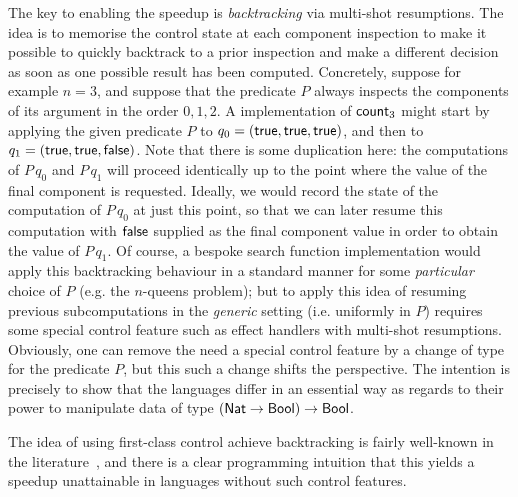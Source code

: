 \documentclass[12pt,phd,lfcs,twoside,openright,logo,leftchapter,normalheadings]{infthesis}
\theoremstyle{plain}
\theoremstyle{definition}
\begin{document}
The key to enabling the speedup is \emph{backtracking} via multi-shot
resumptions. The idea is to memorise the control state at each
component inspection to make it possible to quickly backtrack to a
prior inspection and make a different decision as soon as one
possible result has been computed.
%
Concretely, suppose for example $n = 3$, and suppose that the predicate
$P$ always inspects the components of its argument in the order
$0,1,2$.
%
A \naive implementation of $\mathsf{count}_3$ might start by applying the
given predicate $P$ to $q_0 = (\mathsf{true},\mathsf{true},\mathsf{true})$, and then to
$q_1 = (\mathsf{true},\mathsf{true},\mathsf{false})$.  Note that there is some duplication
here: the computations of $P\,q_0$ and $P\,q_1$ will proceed
identically up to the point where the value of the final component is
requested. Ideally, we would record the state of the computation of
$P\,q_0$ at just this point, so that we can later resume this
computation with $\mathsf{false}$ supplied as the final component value in
order to obtain the value of $P\,q_1$.  Of course, a bespoke search
function implementation would apply this backtracking behaviour in a
standard manner for some \emph{particular} choice of $P$ (e.g. the
$n$-queens problem); but to apply this idea of resuming previous
subcomputations in the \emph{generic} setting (i.e. uniformly in $P$)
requires some special control feature such as effect handlers with
multi-shot resumptions.
%
Obviously, one can remove the need a special control feature by a
change of type for the predicate $P$, but this such a change shifts
the perspective. The intention is precisely to show that the languages
differ in an essential way as regards to their power to manipulate
data of type $(\mathsf{Nat} \to \mathsf{Bool}) \to \mathsf{Bool}$.

The idea of using first-class control achieve backtracking is fairly
well-known in the literature~\cite{KiselyovSFA05}, and there is a
clear programming intuition that this yields a speedup unattainable in
languages without such control features.

\end{document}

